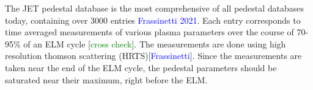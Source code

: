 \documentclass[a4paper, twoside, final, 12pt]{article}
\begin{document}

The JET pedestal database is the most comprehensive of all pedestal databases today, containing over 3000 entries \textcolor{blue}{Frassinetti 2021}.
Each entry corresponds to time averaged measurements of various plasma parameters over the course of 70-95\% of an ELM cycle [\textcolor{green}{cross check}].
The measurements are done using high resolution thomson scattering (HRTS)[\textcolor{blue}{Frassinetti}].
Since the measurements are taken near the end of the ELM cycle, the pedestal parameters should be saturated near their maximum, right before the ELM.
\end{document}
